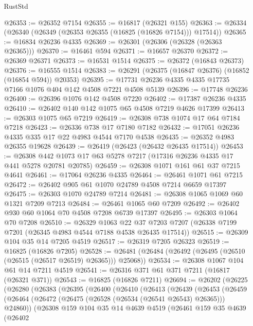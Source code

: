 \begin{lexlean}{RustStd}
\begin{coremodule}
{\begin{coremodule}
{{{{{{{{{{{{{{{{{{{{{{{{{{{{{{{{{{{{{{{{{{{{{{{{{{{{{{{@26353 := @26352 @7154
@26355 := @16817 (@26321 @155)
@26363 := @26334 (@26340 (@26349 (@26353 @26355 (@16825 (@16826 @7154))) @17514))
@26365 := @16834 @26236 @4335
@26369 := @26301 (@26306 (@26328 (@26363 @26365)))
@26370 := @16461 @594
@26371 := @16657 @26370
@26372 := @26369 @26371
@26373 := @16531 @1514
@26375 := @26372 (@16843 @26373)
@26376 := @16555 @1514
@26383 := @26291 (@26375 (@16847 @26376) (@16852 (@16854 @594)) @20353)
@26395 := @17731 @26236 @4335 @4335 @17735 @7166 @1076 @404 @142 @4508 @7221 @4508 @5139
@26396 := @17748 @26236
@26400 := @26396 @1076 @142 @4508 @7220
@26402 := @17387 @26236 @4335
@26410 := @26402 @140 @142 @1075 @65 @4508 @7219 @4626 @17399
@26413 := @26303 @1075 @65 @7219
@26419 := @26308 @738 @1074 @17 @64 @7184 @7218
@26423 := @26336 @738 @17 @7180 @7182
@26432 := @17051 @26236 @4335 @335 @17 @22 @4983 @4544 @7170 @4538
@26435 := @26352 @4983 @26355 @19628
@26439 := @26419 (@26423 (@26432 @26435 @17514))
@26453 := @26308 @442 @1073 @17 @63 @5278 @7217 (@17316 @26236 @4335 @17 @441 @5278 @20781 @20785)
@26459 := @26308 @1071 @161 @61 @37 @7215 @4641
@26461 := @17064 @26236 @4335
@26464 := @26461 @1071 @61 @7215
@26472 := @26402 @905 @61 @1070 @24789 @4508 @7214 @6659 @17397
@26475 := @26303 @1070 @24789 @7214
@26481 := @26308 @1065 @1069 @60 @1321 @7209 @7213
@26484 := @26461 @1065 @60 @7209
@26492 := @26402 @930 @60 @1064 @70 @4508 @7208 @6739 @17397
@26495 := @26303 @1064 @70 @7208
@26510 := @26329
    @1063
    @22
    @37
    @7203
    @7207
    (@26338 @7199 @7201 (@26345 @4983 @4544 @7188 @4538 @26435 @17514))
@26515 := @26309 @104 @35 @14 @7205 @4519
@26517 := @26319 @7205 @26323
@26519 := @16825 (@16826 @7205)
@26528 := @26481 (@26484 (@26492 (@26495 (@26510 (@26515 (@26517 @26519) @26365))) @25068))
@26534 := @26308 @1067 @104 @61 @14 @7211 @4519
@26541 := @26316 @371 @61 @371 @7211 (@16817 (@26321 @371))
@26543 := @16825 (@16826 @7211)
@26694 := @26202
    (@26225
      (@26280
        (@26383
          (@26395
            (@26400
              (@26410
                (@26413
                  (@26439
                    (@26453
                      (@26459
                        (@26464 (@26472 (@26475 (@26528 (@26534 (@26541 @26543) @26365))) @24860))
                        (@26308
                          @159
                          @104
                          @35
                          @14
                          @4639
                          @4519
                          (@26461
                            @159
                            @35
                            @4639
                            (@26402
}}}}}}}}}}}}}}}}}}}}}}}}}}}}}}}}}}}}}}}}}}}}}}}}}}}}}}}
\end{coremodule}}
\end{coremodule}
\end{lexlean}
